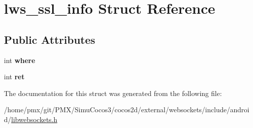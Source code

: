 \hypertarget{structlws__ssl__info}{}\section{lws\+\_\+ssl\+\_\+info Struct Reference}
\label{structlws__ssl__info}
\subsection*{Public Attributes}
\begin{DoxyCompactItemize}
\item 
\mbox{\label{structlws__ssl__info_a921dae1f3e774bb6e3d98acd99499783}} 
int {\bfseries where}
\item 
\mbox{\label{structlws__ssl__info_a7b04faec12eef5639afb3060bb4641b6}} 
int {\bfseries ret}
\end{DoxyCompactItemize}


The documentation for this struct was generated from the following file\+:\begin{DoxyCompactItemize}
\item 
/home/pmx/git/\+P\+M\+X/\+Simu\+Cocos3/cocos2d/external/websockets/include/android/\hyperlink{_2cocos2d_2external_2websockets_2include_2android_2libwebsockets_8h}{libwebsockets.\+h}\end{DoxyCompactItemize}
